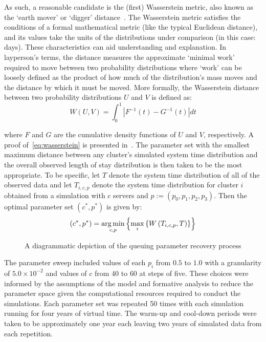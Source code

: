 As such, a reasonable candidate is the (first) Wasserstein metric, also known as
the `earth mover' or `digger' distance~\cite{Vaserstein1969}. The Wasserstein
metric satisfies the conditions of a formal mathematical metric (like the
typical Euclidean distance), and its values take the units of the distributions
under comparison (in this case: days). These characteristics can aid
understanding and explanation. In layperson's terms, the distance measures the
approximate `minimal work' required to move between two probability
distributions where `work' can be loosely defined as the product of how much of
the distribution's mass moves and the distance by which it must be moved. More
formally, the Wasserstein distance between two probability distributions \(U\)
and \(V\) is defined as:
\begin{equation}\label{eq:wasserstein}
    W(U, V) = \int_{0}^{1} \left\vert F^{-1}(t) - G^{-1}(t) \right\vert dt
\end{equation}

\noindent where \(F\) and \(G\) are the cumulative density functions of \(U\)
and \(V\), respectively. A proof of~\eqref{eq:wasserstein} is presented
in~\cite{Ramdas2017}. The parameter set with the smallest maximum distance
between any cluster's simulated system time distribution and the overall
observed length of stay distribution is then taken to be the most appropriate.
To be specific, let \(T\) denote the system time distribution of all of the
observed data and let \(T_{i,c,p}\) denote the system time distribution for
cluster \(i\) obtained from a simulation with \(c\) servers and \(p :=
\left(p_0, p_1, p_2, p_3\right)\). Then the optimal parameter set \(\left(c^*,
p^*\right)\) is given by:
\begin{equation}\label{eq:parameters}
    \left(c^*, p^*\right) = \argmin_{c, p} \left\{%
        \max_{i} \left\{ W\left(T_{i,c,p}, T\right) \right\}%
    \right\}
\end{equation}

\begin{figure}
    \centering%
    \resizebox{!}{.9\textheight}{%
        
    }
    \caption{%
        A diagrammatic depiction of the queuing parameter recovery process
    }\label{fig:process}
\end{figure}

The parameter sweep included values of each \(p_i\) from \(0.5\) to \(1.0\) with
a granularity of \(5.0 \times 10^{-2}\) and values of \(c\) from \(40\) to
\(60\) at steps of five. These choices were informed by the assumptions of the
model and formative analysis to reduce the parameter space given the
computational resources required to conduct the simulations. Each parameter set
was repeated 50 times with each simulation running for four years of virtual
time. The warm-up and cool-down periods were taken to be approximately one year
each leaving two years of simulated data from each repetition.

